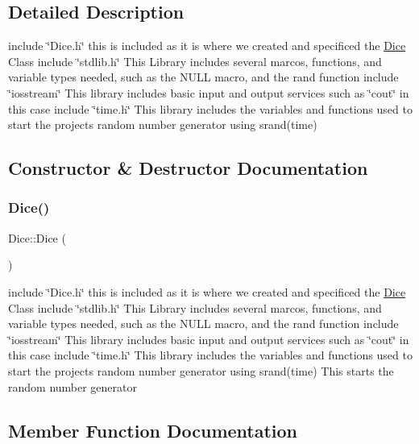 \subsection{Detailed Description}
include \char`\"{}\+Dice.\+h\char`\"{} this is included as it is where we created and specificed the \hyperlink{class_dice}{Dice} Class include \char`\"{}stdlib.\+h\char`\"{} This Library includes several marcos, functions, and variable types needed, such as the N\+U\+LL macro, and the rand function include \char`\"{}iosstream\char`\"{} This library includes basic input and output services such as \char`\"{}cout\char`\"{} in this case include \char`\"{}time.\+h\char`\"{} This library includes the variables and functions used to start the projects random number generator using srand(time) 

\subsection{Constructor \& Destructor Documentation}
\hypertarget{class_dice_a6b9eadd945ad8fd3840379c8824e5d48_a6b9eadd945ad8fd3840379c8824e5d48}{}\label{class_dice_a6b9eadd945ad8fd3840379c8824e5d48_a6b9eadd945ad8fd3840379c8824e5d48} 
\subsubsection{\texorpdfstring{Dice()}{Dice()}}
{\footnotesize\ttfamily Dice\+::\+Dice (\begin{DoxyParamCaption}{ }\end{DoxyParamCaption})}

include \char`\"{}\+Dice.\+h\char`\"{} this is included as it is where we created and specificed the \hyperlink{class_dice}{Dice} Class include \char`\"{}stdlib.\+h\char`\"{} This Library includes several marcos, functions, and variable types needed, such as the N\+U\+LL macro, and the rand function include \char`\"{}iosstream\char`\"{} This library includes basic input and output services such as \char`\"{}cout\char`\"{} in this case include \char`\"{}time.\+h\char`\"{} This library includes the variables and functions used to start the projects random number generator using srand(time) This starts the random number generator

\subsection{Member Function Documentation}
\hypertarget{class_dice_a7fb1c52019fa79aa3b73e6610da9139c_a7fb1c52019fa79aa3b73e6610da9139c}{}\label{class_dice_a7fb1c52019fa79aa3b73e6610da9139c_a7fb1c52019fa79aa3b73e6610da9139c} 
